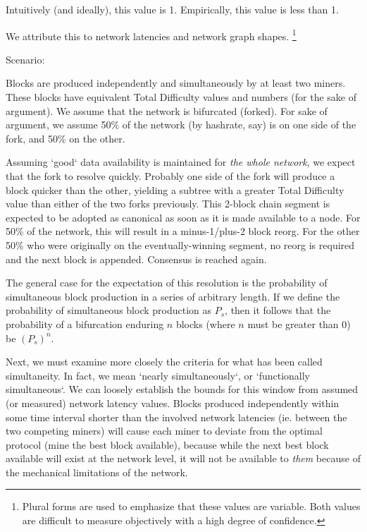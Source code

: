 \documentclass[11pt]{article}
\theoremstyle{plain}
\begin{document}
{Intuitively (and ideally), this value is 1. 
Empirically, this value is less than 1.

We attribute this to network latencies and network graph shapes.\nolinebreak
\footnote{
Plural forms are used to emphasize that these values are variable.
Both values are difficult to measure objectively with a high degree of
confidence.
}

Scenario:

Blocks are produced independently and simultaneously by at least two miners.
These blocks have equivalent Total Difficulty values and numbers (for the sake
of argument).
We assume that the network is bifurcated (forked). For sake of argument, we
assume 50\% of the network (by hashrate, say) is on one side of the fork, and
50\% on the other.

Assuming `good` data availability is maintained for \textit{the whole network},
we expect that the fork to resolve quickly.
Probably one side of the fork will produce a block quicker than the other,
yielding a subtree with a greater Total Difficulty value than either of the two
forks previously.
This 2-block chain segment is expected to be adopted as canonical as soon as it
is made available to a node.
For 50\% of the network, this will result in a minus-1/plus-2 block reorg. For
the other 50\% who were originally on the eventually-winning segment, no reorg
is required and the next block is appended. Consensus is reached again.

The general case for the expectation of this resolution is the probability of
simultaneous block production in a series of arbitrary length.
If we define the probability of simultaneous block production as $P_s$,
then it follows that the probability of a bifurcation enduring $n$ blocks
(where $n$ must be greater than 0) be $(P_{s})^{n}$.

Next, we must examine more closely the criteria for what has been called
simultaneity.
In fact, we mean `nearly simultaneously`, or `functionally simultaneous`.
We can loosely establish the bounds for this window from assumed (or measured)
network latency values.
Blocks produced independently within some time interval shorter than the
involved network latencies (ie. between the two competing miners)
will cause each miner to deviate from the optimal protocol (mine the best block
available), because while the next best block available will exist at the
network level,
it will not be available to \textit{them} because of the mechanical limitations
of the network.

}
\end{document}
